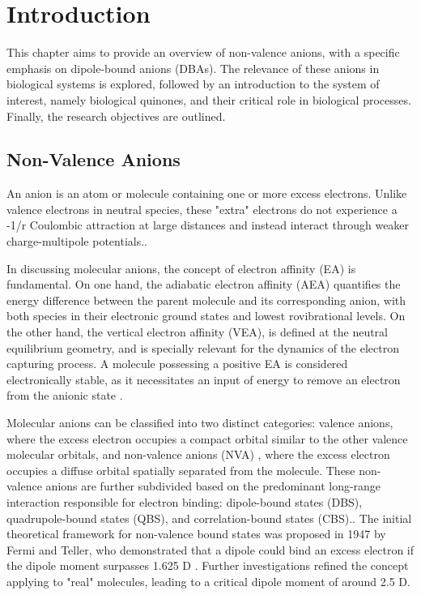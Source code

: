 \chapter{Introduction}\label{ch:introduction}

This chapter aims to provide an overview of non-valence anions, with a specific emphasis on dipole-bound anions (DBAs). The relevance of these anions in biological systems is explored, followed by an introduction to the system of interest, namely biological quinones, and their critical role in biological processes. Finally, the research objectives are outlined.

\section{Non-Valence Anions}
An anion is an atom or molecule containing one or more excess electrons. Unlike valence electrons in neutral species, these "extra" electrons do not experience a -1/r Coulombic attraction at large distances and instead interact through weaker charge-multipole potentials.\cite{simons2008molecular, herbert2015quantum}.

In discussing molecular anions, the concept of electron affinity (EA) is fundamental. On one hand, the adiabatic electron affinity (AEA) quantifies the energy difference between the parent molecule and its corresponding anion, with both species in their electronic ground states and lowest rovibrational levels. On the other hand, the vertical electron affinity (VEA), is defined at the neutral equilibrium geometry, and is specially relevant for the dynamics of the electron capturing process. A molecule possessing a positive EA is considered electronically stable, as it necessitates an input of energy to remove an electron from the anionic state \cite{simons2008molecular}.

Molecular anions can be classified into two distinct categories: valence anions, where the excess electron occupies a compact orbital similar to the other valence molecular orbitals, and non-valence anions (NVA) , where the excess electron occupies a diffuse orbital spatially separated from the molecule. These non-valence anions are further subdivided based on the predominant long-range interaction responsible for electron binding: dipole-bound states (DBS), quadrupole-bound states (QBS), and correlation-bound states (CBS).\cite{simons2008molecular,herbert2015quantum,abdoul1998electrons,simons2023molecular,jordan2003theory}.
The initial theoretical framework for non-valence bound states was proposed in 1947 by Fermi and Teller, who demonstrated that a dipole could bind an excess electron if the dipole moment surpasses 1.625 D \cite{fermi1947capture}. Further investigations refined the concept applying to "real" molecules, leading to a critical dipole moment of around 2.5 D\cite{jordan2003theory}.

